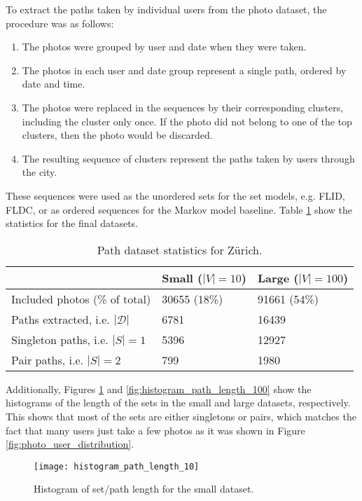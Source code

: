 To extract the paths taken by individual users from the photo dataset, the procedure was as follows:

\begin{enumerate}
  \item The photos were grouped by user and date when they were taken.
  \item The photos in each user and date group represent a single path, ordered by date and time.
  \item The photos were replaced in the sequences by their corresponding clusters, including the cluster only once. If the photo did not belong to one of the top clusters, then the photo would be discarded.
  \item The resulting sequence of clusters represent the paths taken by users through the city.
\end{enumerate}

These sequences were used as the unordered sets for the set models, e.g. FLID, FLDC, or as ordered sequences for the Markov model baseline. Table \ref{tab:path-statistics} show the statistics for the final datasets.

\begin{table}
  \centering
  \caption{Path dataset statistics for Zürich.}
  \begin{tabular}{@{}lll@{}}
    \toprule
    & Small ($|V|=10$)& Large ($|V|=100$)  \\
    \midrule
    Included photos (\% of total) & 30655 (18\%) & 91661 (54\%)\\
    Paths extracted, i.e. $|\mathcal{D}|$ & 6781 & 16439 \\
    Singleton paths, i.e. $|S|=1$ & 5396 & 12927 \\
    Pair paths, i.e. $|S|=2$ & 799 & 1980 \\
    \bottomrule
  \end{tabular}
  \label{tab:path-statistics}
\end{table}

Additionally, Figures \ref{fig:histogram_path_length_10} and \ref{fig:histogram_path_length_100} show the histograms of the length of the sets in the small and large datasets, respectively. This shows that most of the sets are either singletons or pairs, which matches the fact that many users just take a few photos as it was shown in Figure \ref{fig:photo_user_distribution}.

\begin{figure}
  \centering
  \texttt{[image: histogram\_path\_length\_10]}
  \caption{Histogram of set/path length for the small dataset.}
  \label{fig:histogram_path_length_10}
\end{figure}

